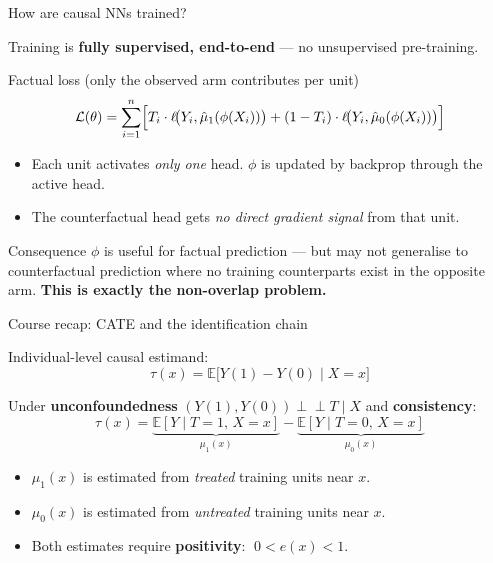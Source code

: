 \documentclass[aspectratio=169]{beamer}
\newcommand{\E}{\mathbb{E}}
\newcommand{\indep}{\perp\!\!\!\perp}
\begin{document}
\begin{frame}{How are causal NNs trained?}

Training is \textbf{fully supervised, end-to-end} --- no unsupervised pre-training.

\begin{block}{Factual loss (only the observed arm contributes per unit)}
\[
\mathcal{L}(\theta)
= \sum_{i=1}^{n}
  \Bigl[
    T_i \cdot \ell\!\bigl(Y_i, \hat\mu_1(\phi(X_i))\bigr)
    +
    (1-T_i)\cdot \ell\!\bigl(Y_i, \hat\mu_0(\phi(X_i))\bigr)
  \Bigr]
\]
\end{block}

\begin{itemize}
  \item Each unit activates \emph{only one} head. $\phi$ is updated by
        backprop through the active head.
  \item The counterfactual head gets \emph{no direct gradient signal}
        from that unit.
\end{itemize}

\begin{alertblock}{Consequence}
$\phi$ is useful for factual prediction --- but may not generalise to
counterfactual prediction where no training counterparts exist in the
opposite arm. \textbf{This is exactly the non-overlap problem.}
\end{alertblock}
\end{frame}

\begin{frame}{Course recap: CATE and the identification chain}

Individual-level causal estimand:
\[
\tau(x) = \E\bigl[Y(1)-Y(0) \mid X=x\bigr]
\]

Under \textbf{unconfoundedness} $(Y(1),Y(0)) \indep T \mid X$
and \textbf{consistency}:
\[
\tau(x)
= \underbrace{\E[Y \mid T=1,\, X=x]}_{\mu_1(x)}
- \underbrace{\E[Y \mid T=0,\, X=x]}_{\mu_0(x)}
\]

\begin{itemize}
  \item $\mu_1(x)$ is estimated from \emph{treated} training units near $x$.
  \item $\mu_0(x)$ is estimated from \emph{untreated} training units near $x$.
  \item Both estimates require \textbf{positivity}: $\;0 < e(x) < 1$.
\end{itemize}
\end{frame}
\end{document}
